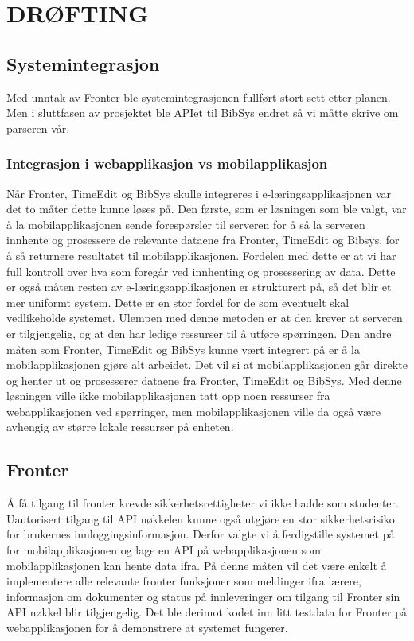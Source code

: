 \documentclass[../main.tex]{subfiles}
\begin{document}
\chapter{DR{\O}FTING}

\section{Systemintegrasjon}
Med unntak av Fronter ble systemintegrasjonen fullført stort sett etter planen. Men i sluttfasen av prosjektet ble APIet til BibSys endret så vi måtte skrive om parseren vår.

\subsection{Integrasjon i webapplikasjon vs mobilapplikasjon}
Når Fronter, TimeEdit og BibSys skulle integreres i e-læringsapplikasjonen var det to måter dette kunne løses på. Den første, som er løsningen som ble valgt, var å la mobilapplikasjonen sende forespørsler til serveren for å så la serveren innhente og prosessere de relevante dataene fra Fronter, TimeEdit og Bibsys, for å så returnere resultatet til mobilapplikasjonen. Fordelen med dette er at vi har full kontroll over hva som foregår ved innhenting og prosessering av data. Dette er også måten resten av e-læringsapplikasjonen er strukturert på, så det blir et mer uniformt system. Dette er en stor fordel for de som eventuelt skal vedlikeholde systemet. Ulempen med denne metoden er at den krever at serveren er tilgjengelig, og at den har ledige ressurser til å utføre spørringen.\newline
Den andre måten som Fronter, TimeEdit og BibSys kunne vært integrert på er å la mobilapplikasjonen gjøre alt arbeidet. Det vil si at mobilapplikasjonen går direkte og henter ut og prosesserer dataene fra Fronter, TimeEdit og BibSys. Med denne løsningen ville ikke mobilapplikasjonen tatt opp noen ressurser fra webapplikasjonen ved spørringer, men mobilapplikasjonen ville da også være avhengig av større lokale ressurser på enheten.

\section{Fronter}

Å få tilgang til fronter krevde sikkerhetsrettigheter vi ikke hadde som studenter. Uautorisert tilgang til API nøkkelen kunne også utgjøre en stor sikkerhetsrisiko for brukernes innloggingsinformasjon. Derfor valgte vi å ferdigstille systemet på for mobilapplikasjonen og lage en API på webapplikasjonen som mobilapplikasjonen kan hente data ifra. På denne måten vil det være enkelt å implementere alle relevante fronter funksjoner som meldinger ifra lærere, informasjon om dokumenter og status på innleveringer om tilgang til Fronter sin API nøkkel blir tilgjengelig. Det ble derimot kodet inn litt testdata for Fronter på webapplikasjonen for å demonstrere at systemet fungerer.
\end{document}
